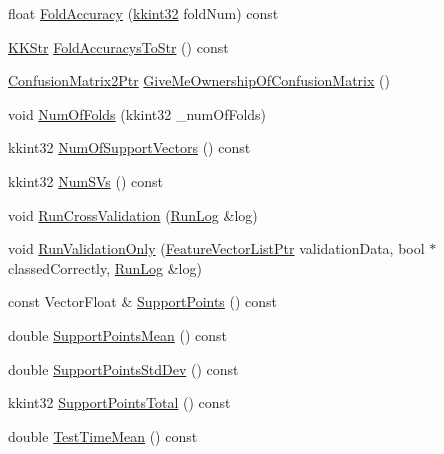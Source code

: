 \begin{DoxyCompactItemize}
\item 
float \hyperlink{class_k_k_m_l_l_1_1_cross_validation_ab72bb1df2e962797cd342460a29c01f7}{Fold\+Accuracy} (\hyperlink{namespace_k_k_b_a8fa4952cc84fda1de4bec1fbdd8d5b1b}{kkint32} fold\+Num) const 
\item 
\hyperlink{class_k_k_b_1_1_k_k_str}{K\+K\+Str} \hyperlink{class_k_k_m_l_l_1_1_cross_validation_a34437d341daa6ed8c17592f28f67f279}{Fold\+Accuracys\+To\+Str} () const 
\item 
\hyperlink{namespace_k_k_m_l_l_a724c9a3c5315800e128adf68253e91ae}{Confusion\+Matrix2\+Ptr} \hyperlink{class_k_k_m_l_l_1_1_cross_validation_a3b65492f42fd9ea9dcaf36289cd38ca0}{Give\+Me\+Ownership\+Of\+Confusion\+Matrix} ()
\item 
void \hyperlink{class_k_k_m_l_l_1_1_cross_validation_ad9a6974458f70bef2a1c773ddbfaea8f}{Num\+Of\+Folds} (kkint32 \+\_\+num\+Of\+Folds)
\item 
kkint32 \hyperlink{class_k_k_m_l_l_1_1_cross_validation_a06b70dd82b9d39d62f2497717863b642}{Num\+Of\+Support\+Vectors} () const 
\item 
kkint32 \hyperlink{class_k_k_m_l_l_1_1_cross_validation_af354797ee53402ba2bfb7e5edf0db4e2}{Num\+S\+Vs} () const 
\item 
void \hyperlink{class_k_k_m_l_l_1_1_cross_validation_a8b00470a7c930864edafe62255c85111}{Run\+Cross\+Validation} (\hyperlink{class_k_k_b_1_1_run_log}{Run\+Log} \&log)
\item 
void \hyperlink{class_k_k_m_l_l_1_1_cross_validation_a9178a5da95fc1b9ab10c83444e995f6f}{Run\+Validation\+Only} (\hyperlink{namespace_k_k_m_l_l_acf2ba92a3cf03e2b19674b24ff488ef6}{Feature\+Vector\+List\+Ptr} validation\+Data, bool $\ast$classed\+Correctly, \hyperlink{class_k_k_b_1_1_run_log}{Run\+Log} \&log)
\item 
const Vector\+Float \& \hyperlink{class_k_k_m_l_l_1_1_cross_validation_adce45685724f2b0de3b5d91843579a32}{Support\+Points} () const 
\item 
double \hyperlink{class_k_k_m_l_l_1_1_cross_validation_a34168a1559c09dc3860d633f4615f4f1}{Support\+Points\+Mean} () const 
\item 
double \hyperlink{class_k_k_m_l_l_1_1_cross_validation_af30856525f5b6303164d2067befb78d0}{Support\+Points\+Std\+Dev} () const 
\item 
kkint32 \hyperlink{class_k_k_m_l_l_1_1_cross_validation_a27e9156ded9569371435fb6d45ef9cc4}{Support\+Points\+Total} () const 
\item 
double \hyperlink{class_k_k_m_l_l_1_1_cross_validation_a8ab2706fb459d0bebb0c701f0da7396a}{Test\+Time\+Mean} () const 

\end{DoxyCompactItemize}
